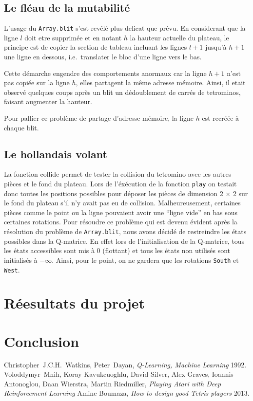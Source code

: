 \documentclass{report}
\begin{document}
\section{Le fl\'eau de la mutabilité}
L'usage du \texttt{Array.blit} s'est revélé plus delicat que prévu. En
considerant que la ligne \(l\) doit etre supprimée et en notant \(h\) la hauteur
actuelle du plateau, le principe est de copier la section de tableau incluant
les lignes \(l+1\) jusqu'à \(h+1\) une ligne en dessous, i.e.\ translater le
bloc d'une ligne vers le bas.

Cette démarche engendre des comportements anormaux car la ligne \(h+1\) n'est
pas copiée sur la ligne \(h\), elles partagent la même adresse mémoire. Ainsi,
il etait observé quelques coups après un blit un dédoublement de carrés de
tetrominos, faisant augmenter la hauteur.

Pour pallier ce problème de partage d'adresse mémoire, la ligne \(h\) est
recréée à chaque blit.

\section{Le hollandais volant}\label{volant}
La fonction collide permet de tester la collision du tetromino avec les autres
pièces et le fond du plateau. Lors de l'éxécution de la fonction \texttt{play}
on testait donc toutes les positions possibles pour déposer les pièces de
dimension 2 \(\times \) 2 sur le fond du plateau s'il n'y avait pas eu de
collision. Malheureusement, certaines pièces comme le point ou la ligne
pouvaient avoir une ``ligne vide'' en bas sous certaines rotations. Pour
résoudre ce problème qui est devenu évident après la résolution du problème de
\texttt{Array.blit}, nous avons décidé de restreindre les états possibles dans
la Q-matrice. En effet lors de l'initialisation de la Q-matrice, tous les états
accessibles sont mis à 0 (flottant) et tous les états non utilisés sont
initialisés à \(-\infty \). Ainsi, pour le point, on ne gardera que les
rotations \texttt{South} et \texttt{West}.

\chapter{Réesultats du projet}

\chapter*{Conclusion}

\begin{thebibliography}{9}
    Christopher~J.C.H.~Watkins, Peter~Dayan,
    \textit{Q-Learning, Machine Learning}
    1992.
    Voloddymyr~Mnih, Koray Kavukcuoghlu, David Silver, Alex Graves, Ioannis
    Antonoglou, Daan Wierstra, Martin Riedmiller,
    \textit{Playing Atari with Deep Reinforcement Learning}
    Amine Boumaza,
    \textit{How to design good Tetris players}
    2013.
\end{thebibliography}
\end{document}
